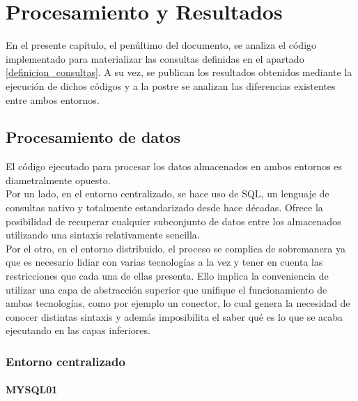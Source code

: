 
\pagestyle{fancy}

\chapter{Procesamiento y Resultados}
\label{procesamiento_datos}

En el presente capítulo, el penúltimo del documento, se analiza el código implementado para materializar las consultas definidas en el apartado \ref*{definicion_consultas}. A su vez, se publican los resultados obtenidos mediante la ejecución de dichos códigos y a la postre se analizan las diferencias existentes entre ambos entornos.

\section{Procesamiento de datos}

El código ejecutado para procesar los datos almacenados en ambos entornos es diametralmente opuesto.\\

Por un lado, en el entorno centralizado, se hace uso de SQL, un lenguaje de consultas nativo y totalmente estandarizado desde hace décadas. Ofrece la posibilidad de recuperar cualquier subconjunto de datos entre los almacenados utilizando una sintaxis relativamente sencilla.\\

Por el otro, en el entorno distribuido, el proceso se complica de sobremanera ya que es necesario lidiar con varias tecnologías a la vez y tener en cuenta las restricciones que cada una de ellas presenta. Ello implica la conveniencia de utilizar una capa de abstracción superior que unifique el funcionamiento de ambas tecnologías, como por ejemplo un conector, lo cual genera la necesidad de conocer distintas sintaxis y además imposibilita el saber qué es lo que se acaba ejecutando en las capas inferiores.\\

\subsection{Entorno centralizado}
 
\subsubsection[]{MYSQL01}

